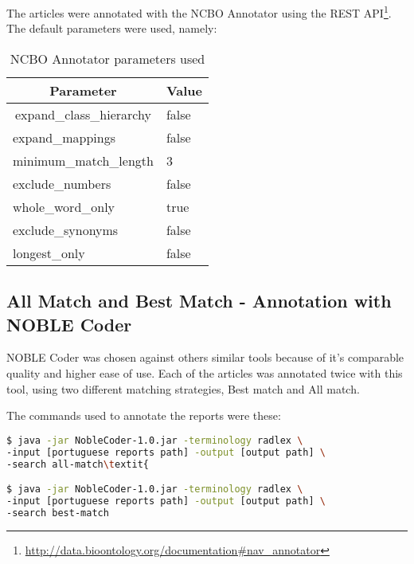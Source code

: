 The articles were annotated with the NCBO Annotator using the REST API\footnote{\url{http://data.bioontology.org/documentation\#nav_annotator}}. The default parameters were used, namely:

\begin{table}[h]
\centering
\caption{NCBO Annotator parameters used}
\label{table-ncbo-parameters}
\begin{tabular}{|l|l|}
\hline
\multicolumn{1}{|c|}{\textbf{Parameter}}       & \multicolumn{1}{c|}{\textbf{Value}} \\ \hline
\multicolumn{1}{|c|}{expand\_class\_hierarchy} & false                               \\ \hline
expand\_mappings                               & false                               \\ \hline
minimum\_match\_length                         & 3                                   \\ \hline
exclude\_numbers                               & false                               \\ \hline
whole\_word\_only                              & true                                \\ \hline
exclude\_synonyms                              & false                               \\ \hline
longest\_only                                  & false                               \\ \hline
\end{tabular}
\end{table}

\subsection{All Match and Best Match - Annotation with NOBLE Coder}

NOBLE Coder was chosen against others similar tools because of it's comparable quality and higher ease of use. Each of the articles was annotated twice with this tool, using two different matching strategies, Best match and All match.

The commands used to annotate the reports were these:


\begin{lstlisting}[language=bash]
$ java -jar NobleCoder-1.0.jar -terminology radlex \
-input [portuguese reports path] -output [output path] \
-search all-match\textit{

$ java -jar NobleCoder-1.0.jar -terminology radlex \
-input [portuguese reports path] -output [output path] \
-search best-match
\end{lstlisting}


